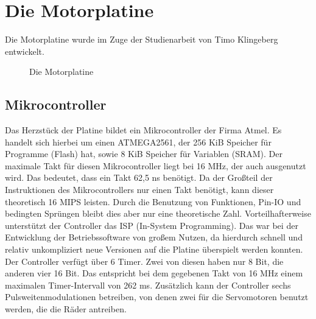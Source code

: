 \section{Die Motorplatine}
Die Motorplatine wurde im Zuge der Studienarbeit von Timo Klingeberg \cite{STUD_TIMO}
entwickelt.
\begin{figure}[htb]
 \centering
 \caption{\label{board}Die Motorplatine}
\end{figure}
\subsection{Mikrocontroller}
Das Herzstück der Platine bildet ein Mikrocontroller der Firma Atmel.
Es handelt sich hierbei um einen ATMEGA2561\cite{ATMEGA_MANUAL}, der 256 KiB Speicher für
Programme (Flash) hat, sowie 8 KiB Speicher für Variablen (SRAM). Der maximale Takt für
diesen Mikrocontroller liegt bei 16 MHz, der auch ausgenutzt wird. Das bedeutet, dass
ein Takt 62,5 ns benötigt. Da der Großteil der Instruktionen des Mikrocontrollers nur
einen Takt benötigt, kann dieser theoretisch 16 MIPS leisten. Durch die Benutzung
von Funktionen, Pin-IO und bedingten Sprüngen bleibt dies aber nur eine theoretische Zahl.
Vorteilhafterweise unterstützt der Controller das ISP (In-System Programming). Das war bei der
Entwicklung der Betriebssoftware von großem Nutzen, da hierdurch schnell und relativ
unkompliziert neue Versionen auf die Platine überspielt werden konnten.\\
Der Controller verfügt über 6 Timer. Zwei von diesen haben nur 8 Bit, die anderen vier
16 Bit. Das entspricht bei dem gegebenen Takt von 16 MHz einem maximalen Timer-Intervall von 262 ms.
Zusätzlich kann der Controller sechs Pulsweitenmodulationen betreiben, von
denen zwei für die Servomotoren benutzt werden, die die Räder antreiben.
